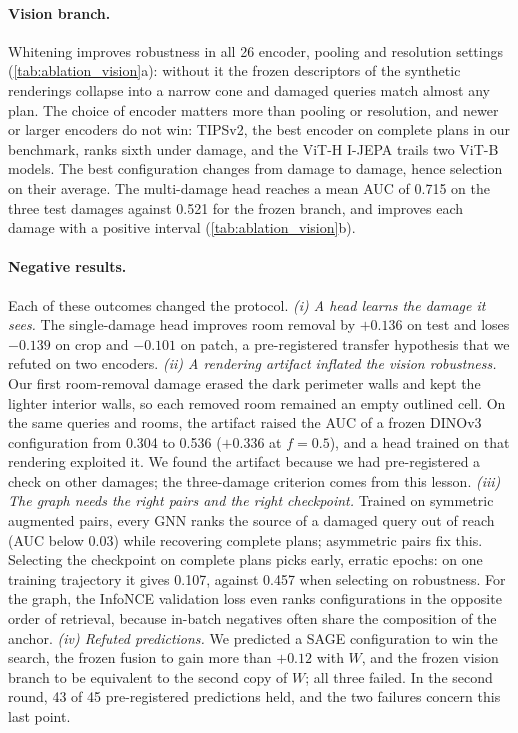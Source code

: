 \paragraph{Vision branch.}
Whitening improves robustness in all 26 encoder, pooling and resolution settings (\cref{tab:ablation_vision}a): without it the frozen descriptors of the synthetic renderings collapse into a narrow cone and damaged queries match almost any plan.
The choice of encoder matters more than pooling or resolution, and newer or larger encoders do not win: TIPSv2, the best encoder on complete plans in our benchmark, ranks sixth under damage, and the ViT-H I-JEPA trails two ViT-B models.
The best configuration changes from damage to damage, hence selection on their average.
The multi-damage head reaches a mean AUC of 0.715 on the three test damages against 0.521 for the frozen branch, and improves each damage with a positive interval (\cref{tab:ablation_vision}b).

\paragraph{Negative results.}
Each of these outcomes changed the protocol.
\emph{(i) A head learns the damage it sees.}
The single-damage head improves room removal by $+0.136$ on test and loses $-0.139$ on crop and $-0.101$ on patch, a pre-registered transfer hypothesis that we refuted on two encoders.
\emph{(ii) A rendering artifact inflated the vision robustness.}
Our first room-removal damage erased the dark perimeter walls and kept the lighter interior walls, so each removed room remained an empty outlined cell.
On the same queries and rooms, the artifact raised the AUC of a frozen DINOv3 configuration from 0.304 to 0.536 ($+0.336$ at $f=0.5$), and a head trained on that rendering exploited it.
We found the artifact because we had pre-registered a check on other damages; the three-damage criterion comes from this lesson.
\emph{(iii) The graph needs the right pairs and the right checkpoint.}
Trained on symmetric augmented pairs, every GNN ranks the source of a damaged query out of reach (AUC below 0.03) while recovering complete plans; asymmetric pairs fix this.
Selecting the checkpoint on complete plans picks early, erratic epochs: on one training trajectory it gives 0.107, against 0.457 when selecting on robustness.
For the graph, the InfoNCE validation loss even ranks configurations in the opposite order of retrieval, because in-batch negatives often share the composition of the anchor.
\emph{(iv) Refuted predictions.}
We predicted a SAGE configuration to win the search, the frozen fusion to gain more than $+0.12$ with $W$, and the frozen vision branch to be equivalent to the second copy of $W$; all three failed.
In the second round, 43 of 45 pre-registered predictions held, and the two failures concern this last point.

